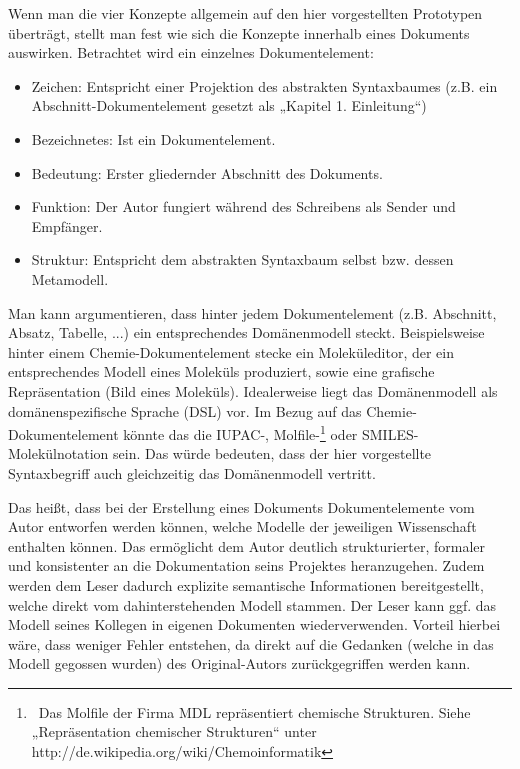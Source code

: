  
Wenn man die vier Konzepte allgemein auf den hier vorgestellten Prototypen überträgt, stellt man fest wie sich die Konzepte innerhalb eines Dokuments auswirken. Betrachtet wird ein einzelnes Dokumentelement:

 
\begin{itemize}

\item Zeichen: Entspricht einer Projektion des abstrakten Syntaxbaumes (z.B. ein Abschnitt-Dokumentelement gesetzt als „Kapitel 1. Einleitung“)
\item Bezeichnetes: Ist ein Dokumentelement.
\item Bedeutung: Erster gliedernder Abschnitt des Dokuments.
\item Funktion: Der Autor fungiert während des Schreibens als Sender und Empfänger.
\item Struktur: Entspricht dem abstrakten Syntaxbaum selbst bzw. dessen Metamodell.
\end{itemize}
 
Man kann argumentieren, dass hinter jedem Dokumentelement (z.B. Abschnitt, Absatz, Tabelle, ...) ein entsprechendes Domänenmodell steckt. Beispielsweise hinter einem Chemie-Dokumentelement stecke ein Moleküleditor, der ein entsprechendes Modell eines Moleküls produziert, sowie eine grafische Repräsentation (Bild eines Moleküls). Idealerweise liegt das Domänenmodell als domänenspezifische Sprache (DSL) vor. Im Bezug auf das Chemie-Dokumentelement könnte das die IUPAC-, Molfile-\footnote{~Das Molfile der Firma MDL repräsentiert chemische Strukturen. Siehe „Repräsentation chemischer Strukturen“ unter http://de.wikipedia.org/wiki/Chemoinformatik } oder SMILES-Molekülnotation sein. Das würde bedeuten, dass der hier vorgestellte Syntaxbegriff auch gleichzeitig das Domänenmodell vertritt.

 
Das heißt, dass bei der Erstellung eines Dokuments Dokumentelemente vom Autor entworfen werden können, welche Modelle der jeweiligen Wissenschaft enthalten können. Das ermöglicht dem Autor deutlich strukturierter, formaler und konsistenter an die Dokumentation seins Projektes heranzugehen. Zudem werden dem Leser dadurch explizite semantische Informationen bereitgestellt, welche direkt vom dahinterstehenden Modell stammen. Der Leser kann ggf. das Modell seines Kollegen in eigenen Dokumenten wiederverwenden. Vorteil hierbei wäre, dass weniger Fehler entstehen, da direkt auf die Gedanken (welche in das Modell gegossen wurden) des Original-Autors zurückgegriffen werden kann.

